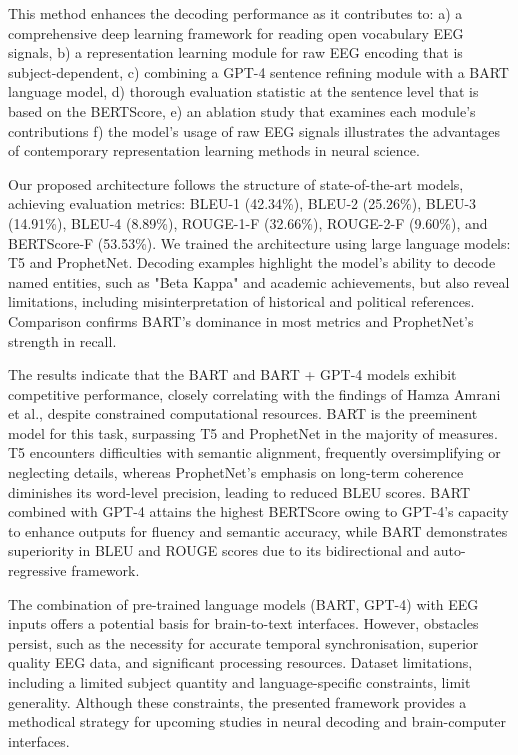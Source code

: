 \documentclass[journal]{IEEEtran}
\begin{document}
This method enhances the decoding performance as it contributes to: a) a comprehensive deep learning framework for reading open vocabulary EEG signals, b) a representation learning module for raw EEG encoding that is subject-dependent, c) combining a GPT-4 sentence refining module with a BART language model, d) thorough evaluation statistic at the sentence level that is based on the BERTScore, e) an ablation study that examines each module's contributions f) the model's usage of raw EEG signals illustrates the advantages of contemporary representation learning methods in neural science.

Our proposed architecture follows the structure of state-of-the-art models, achieving evaluation metrics: BLEU-1 (42.34\%), BLEU-2 (25.26\%), BLEU-3 (14.91\%), BLEU-4 (8.89\%), ROUGE-1-F (32.66\%), ROUGE-2-F (9.60\%), and BERTScore-F (53.53\%). We trained the architecture using large language models: T5 and ProphetNet. Decoding examples highlight the model's ability to decode named entities, such as "Beta Kappa" and academic achievements, but also reveal limitations, including misinterpretation of historical and political references. Comparison confirms BART's dominance in most metrics and ProphetNet's strength in recall.
    
The results indicate that the BART and BART + GPT-4 models exhibit competitive performance, closely correlating with the findings of Hamza Amrani et al., despite constrained computational resources. BART is the preeminent model for this task, surpassing T5 and ProphetNet in the majority of measures. T5 encounters difficulties with semantic alignment, frequently oversimplifying or neglecting details, whereas ProphetNet's emphasis on long-term coherence diminishes its word-level precision, leading to reduced BLEU scores. BART combined with GPT-4 attains the highest BERTScore owing to GPT-4's capacity to enhance outputs for fluency and semantic accuracy, while BART demonstrates superiority in BLEU and ROUGE scores due to its bidirectional and auto-regressive framework.
    
The combination of pre-trained language models (BART, GPT-4) with EEG inputs offers a potential basis for brain-to-text interfaces. However, obstacles persist, such as the necessity for accurate temporal synchronisation, superior quality EEG data, and significant processing resources. Dataset limitations, including a limited subject quantity and language-specific constraints, limit generality. Although these constraints, the presented framework provides a methodical strategy for upcoming studies in neural decoding and brain-computer interfaces.
\end{document}
